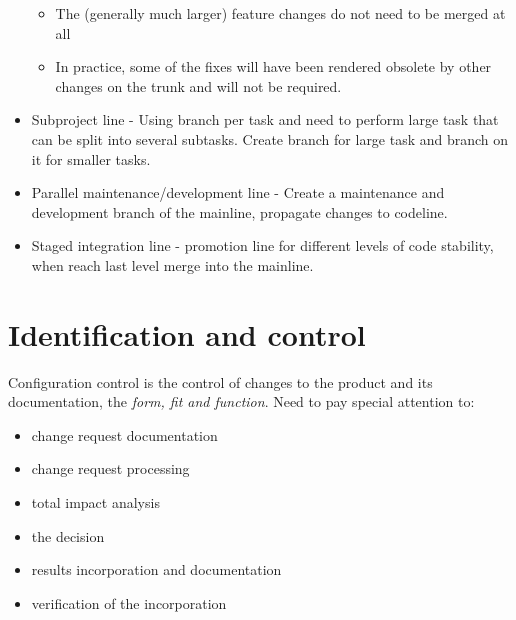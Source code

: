 \documentclass{article}
\begin{document}
\begin{itemize}
\begin{itemize}
        \item The (generally much larger) feature changes do not need to be merged at all
        \item In practice, some of the fixes will have been rendered obsolete by other changes on the trunk and will not be required.
    \end{itemize}
    \item Subproject line - Using branch per task and need to perform large task that can be split into several subtasks. Create branch for large task and branch on it for smaller tasks.
    \item Parallel maintenance/development line - Create a maintenance and development branch of the mainline, propagate changes to codeline.
    \item Staged integration line - promotion line for different levels of code stability, when reach last level merge into the mainline.
\end{itemize}

\section{Identification and control}
Configuration control is the control of changes to the product and its documentation, the \textit{form, fit and function}. 
Need to pay special attention to:
\begin{itemize}
    \item change request documentation
    \item change request processing
    \item total impact analysis
    \item the decision
    \item results incorporation and documentation
    \item verification of the incorporation
\end{itemize}
\end{document}
